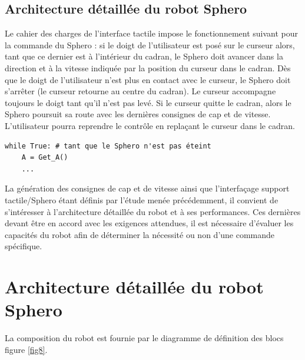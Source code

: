 \subsection{Architecture détaillée du robot Sphero}

Le cahier des charges de l'interface tactile impose le fonctionnement suivant pour la commande du Sphero : si le doigt de l'utilisateur est posé sur le curseur alors, tant que ce dernier est à l'intérieur du cadran, le Sphero doit avancer dans la direction et à la vitesse indiquée par la position du curseur dans le cadran. Dès que le doigt de l'utilisateur n'est plus en contact avec le curseur, le Sphero doit s'arrêter (le curseur retourne au centre du cadran). Le curseur accompagne toujours le doigt tant qu'il n'est pas levé. Si le curseur quitte le cadran, alors le Sphero poursuit sa route avec les dernières consignes de cap et de vitesse. L'utilisateur pourra reprendre le contrôle en replaçant le curseur dans le cadran. 


\begin{verbatim}
while True: # tant que le Sphero n'est pas éteint
    A = Get_A() 
    ... 
\end{verbatim}

La génération des consignes de cap et de vitesse ainsi que l'interfaçage support tactile/Sphero étant définis par l'étude menée précédemment, il convient de s'intéresser à l'architecture détaillée du robot et à ses performances. Ces dernières devant être en accord avec les exigences attendues, il est nécessaire d'évaluer les capacités du robot afin de déterminer la nécessité ou non d'une commande spécifique. 

\section{Architecture  détaillée du robot Sphero}

La composition du robot est fournie par le diagramme de définition des blocs figure \ref{fig8}. 

